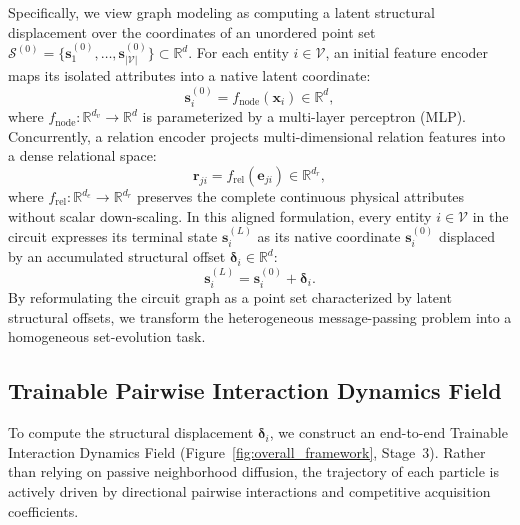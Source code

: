 Specifically, we view graph modeling as computing a latent structural displacement over the coordinates of an unordered point set $\mathcal{S}^{(0)} = \{\mathbf{s}_1^{(0)}, \dots, \mathbf{s}_{|\mathcal{V}|}^{(0)}\} \subset \mathbb{R}^d$. For each entity $i \in \mathcal{V}$, an initial feature encoder maps its isolated attributes into a native latent coordinate:
\begin{equation}
    \mathbf{s}_i^{(0)} = f_{\text{node}}(\mathbf{x}_i) \in \mathbb{R}^{d},
    \label{eq:node_init}
\end{equation}
where $f_{\text{node}}: \mathbb{R}^{d_v} \to \mathbb{R}^d$ is parameterized by a multi-layer perceptron (MLP). Concurrently, a relation encoder projects multi-dimensional relation features into a dense relational space:
\begin{equation}
    \mathbf{r}_{ji} = f_{\text{rel}}(\mathbf{e}_{ji}) \in \mathbb{R}^{d_r},
    \label{eq:rel_init}
\end{equation}
where $f_{\text{rel}}: \mathbb{R}^{d_e} \to \mathbb{R}^{d_r}$ preserves the complete continuous physical attributes without scalar down-scaling. In this aligned formulation, every entity $i \in \mathcal{V}$ in the circuit expresses its terminal state $\mathbf{s}_i^{(L)}$ as its native coordinate $\mathbf{s}_i^{(0)}$ displaced by an accumulated structural offset $\boldsymbol{\delta}_i \in \mathbb{R}^d$:
\begin{equation}
    \mathbf{s}_i^{(L)} = \mathbf{s}_i^{(0)} + \boldsymbol{\delta}_i.
    \label{eq:structural_offset}
\end{equation}
By reformulating the circuit graph as a point set characterized by latent structural offsets, we transform the heterogeneous message-passing problem into a homogeneous set-evolution task.

\subsection{Trainable Pairwise Interaction Dynamics Field}
\label{sec:method_dynamics}

\renderFigureDynamics{}

To compute the structural displacement $\boldsymbol{\delta}_i$, we construct an end-to-end Trainable Interaction Dynamics Field (Figure~\ref{fig:overall_framework}, Stage~3). Rather than relying on passive neighborhood diffusion, the trajectory of each particle is actively driven by directional pairwise interactions and competitive acquisition coefficients.

